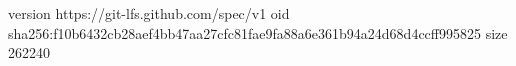 version https://git-lfs.github.com/spec/v1
oid sha256:f10b6432cb28aef4bb47aa27cfc81fae9fa88a6e361b94a24d68d4ccff995825
size 262240

